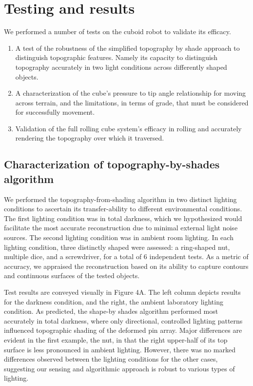 \documentclass[letterpaper, 12 pt, conference]{ieeeconf}  %
\begin{document}
\section{Testing and results}

We performed a number of tests on the cuboid robot to validate its efficacy.
\begin{enumerate}
    \item A test of the robustness of the simplified topography by shade approach to distinguish topographic features. Namely its capacity to distinguish topography accurately in two light conditions across differently shaped objects. 
    \item A characterization of the cube's pressure to tip angle relationship for moving across terrain, and the limitations, in terms of grade, that must be considered for successfully movement. 
    \item Validation of the full rolling cube system's efficacy in rolling and accurately rendering the topography over which it traversed.
\end{enumerate}

\subsection{Characterization of topography-by-shades algorithm}

We performed the topography-from-shading algorithm in two distinct lighting conditions to ascertain its transfer-ability to different environmental conditions. The first lighting condition was in total darkness, which we hypothesized would facilitate the most accurate reconstruction due to minimal external light noise sources. The second lighting condition was in ambient room lighting. In each lighting condition, three distinctly shaped were assessed: a ring-shaped nut, multiple dice, and a screwdriver, for a total of 6 independent tests. As a metric of accuracy, we appraised the reconstruction based on its ability to capture contours and continuous surfaces of the tested objects. 

Test results are conveyed visually in Figure 4A. The left column depicts results for the darkness condition, and the right, the ambient laboratory lighting condition. As predicted, the shape-by shades algorithm performed most accurately in total darkness, where only directional, controlled lighting patterns influenced topographic shading of the deformed pin array. Major differences are evident in the first example, the nut, in that the right upper-half of its top surface is less pronounced in ambient lighting. However, there was no marked differences observed between the lighting conditions for the other cases, suggesting our sensing and algorithmic approach is robust to various types of lighting. 
\end{document}
